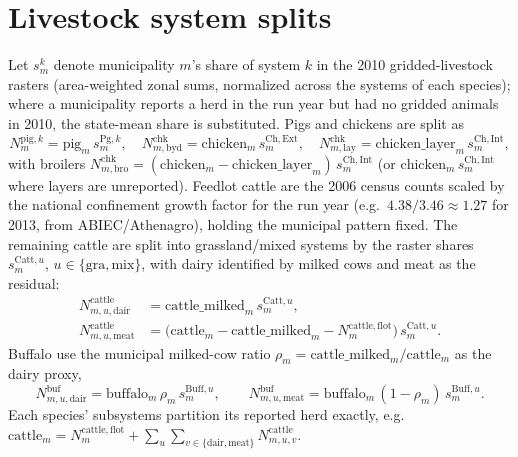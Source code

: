 \section{Livestock system splits}\label{app:livestock}
Let $s^{k}_m$ denote municipality $m$'s share of system $k$ in the 2010
gridded-livestock rasters (area-weighted zonal sums, normalized across the
systems of each species); where a municipality reports a herd in the run year
but had no gridded animals in 2010, the state-mean share is substituted. Pigs
and chickens are split as
\begin{equation}
  N^{\mathrm{pig},k}_m=\text{pig}_m\,s^{\mathrm{Pg},k}_m,\quad
  N^{\mathrm{chk}}_{m,\mathrm{byd}}=\text{chicken}_m\,s^{\mathrm{Ch,Ext}}_m,\quad
  N^{\mathrm{chk}}_{m,\mathrm{lay}}=\text{chicken\_layer}_m\,s^{\mathrm{Ch,Int}}_m,
\end{equation}
with broilers
$N^{\mathrm{chk}}_{m,\mathrm{bro}}=(\text{chicken}_m-\text{chicken\_layer}_m)\,s^{\mathrm{Ch,Int}}_m$
(or $\text{chicken}_m\,s^{\mathrm{Ch,Int}}_m$ where layers are unreported).
Feedlot cattle are the 2006 census counts scaled by the national confinement
growth factor for the run year (e.g.\ $4.38/3.46\approx1.27$ for 2013, from
ABIEC/Athenagro), holding the municipal pattern fixed. The remaining cattle
are split into grassland/mixed systems by the raster shares
$s^{\mathrm{Catt},u}_m$, $u\in\{\mathrm{gra,mix}\}$, with dairy identified by
milked cows and meat as the residual:
\begin{align}
  N^{\mathrm{cattle}}_{m,u,\mathrm{dair}}&=\text{cattle\_milked}_m\,s^{\mathrm{Catt},u}_m,\\
  N^{\mathrm{cattle}}_{m,u,\mathrm{meat}}&=\big(\text{cattle}_m-\text{cattle\_milked}_m-N^{\mathrm{cattle,flot}}_m\big)\,s^{\mathrm{Catt},u}_m .
\end{align}
Buffalo use the municipal milked-cow ratio
$\rho_m=\text{cattle\_milked}_m/\text{cattle}_m$ as the dairy proxy,
\begin{equation}
  N^{\mathrm{buf}}_{m,u,\mathrm{dair}}=\text{buffalo}_m\,\rho_m\,s^{\mathrm{Buff},u}_m,
  \qquad
  N^{\mathrm{buf}}_{m,u,\mathrm{meat}}=\text{buffalo}_m\,(1-\rho_m)\,s^{\mathrm{Buff},u}_m .
\end{equation}
Each species' subsystems partition its reported herd exactly, e.g.\
$\text{cattle}_m=N^{\mathrm{cattle,flot}}_m+\sum_{u}\sum_{v\in\{\mathrm{dair,meat}\}}N^{\mathrm{cattle}}_{m,u,v}$.

